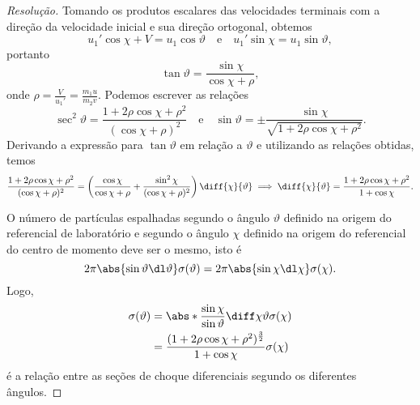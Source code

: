 \begin{proof}[Resolução]
    Tomando os produtos escalares das velocidades terminais com a direção da velocidade inicial e sua direção ortogonal, obtemos
    \begin{equation*}
        u_1' \cos\chi + V = u_1 \cos\vartheta \quad\text{e}\quad u_1' \sin\chi = u_1 \sin \vartheta,
    \end{equation*}
    portanto
    \begin{equation*}
        \tan \vartheta = \frac{\sin\chi}{\cos\chi + \rho},
    \end{equation*}
    onde \(\rho = \frac{V}{u_1'} = \frac{m_1 u}{m_2 v}.\) Podemos escrever as relações
    \begin{equation*}
        \sec^2 \vartheta = \frac{1 + 2 \rho \cos\chi + \rho^2}{(\cos\chi + \rho)^2}
        \quad\text{e}\quad
        \sin\vartheta = \pm \frac{\sin\chi}{\sqrt{1 + 2 \rho \cos\chi + \rho^2}}.
    \end{equation*}
    Derivando a expressão para \(\tan \vartheta\) em relação a \(\vartheta\) e utilizando as relações obtidas, temos
    \begin{equation*}
        \frac{1 + 2 \rho \cos\chi + \rho^2}{(\cos\chi + \rho)^2} = \left(\frac{\cos\chi}{\cos \chi + \rho} + \frac{\sin^2\chi}{(\cos\chi+\rho)^2}\right) \diff{\chi}{\vartheta} \implies \diff{\chi}{\vartheta} = \frac{1 + 2\rho \cos\chi + \rho^2}{1 + \cos\chi}.
    \end{equation*}

    O número de partículas espalhadas segundo o ângulo \(\vartheta\) definido na origem do referencial de laboratório e segundo o ângulo \(\chi\) definido na origem do referencial do centro de momento deve ser o mesmo, isto é
    \begin{equation*}
        2\pi\abs{\sin\vartheta \dl\vartheta} \sigma(\vartheta) = 2\pi \abs{\sin\chi \dl\chi} \sigma(\chi).
    \end{equation*}
    Logo,
    \begin{align*}
        \sigma(\vartheta) &= \abs*{\frac{\sin\chi}{\sin\vartheta} \diff\chi\vartheta} \sigma(\chi)\\
                          &= \frac{(1 + 2\rho\cos\chi + \rho^2)^{\frac32}}{1+\cos\chi} \sigma(\chi)
    \end{align*}
    é a relação entre as seções de choque diferenciais segundo os diferentes ângulos.
\end{proof}
